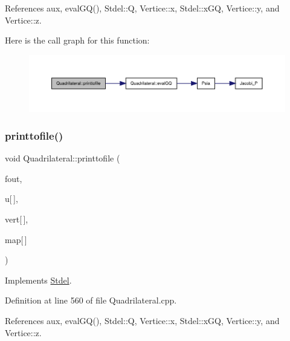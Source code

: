 References aux, eval\+G\+Q(), Stdel\+::Q, Vertice\+::x, Stdel\+::x\+GQ, Vertice\+::y, and Vertice\+::z.

Here is the call graph for this function\+:
\nopagebreak
\begin{figure}[H]
\begin{center}
\leavevmode
\includegraphics[width=350pt]{classQuadrilateral_af2a943c2b5b073fde641ce93b70f95b4_cgraph}
\end{center}
\end{figure}
\mbox{\label{classQuadrilateral_a45573246616ded9a71b895de3969c20d}} 
\subsubsection{\texorpdfstring{printtofile()}{printtofile()}\hspace{0.1cm}{\footnotesize\ttfamily [2/2]}}
{\footnotesize\ttfamily void Quadrilateral\+::printtofile (\begin{DoxyParamCaption}\item[{F\+I\+LE $\ast$}]{fout,  }\item[{const double}]{u\mbox{[}$\,$\mbox{]},  }\item[{const \hyperlink{structVertice}{Vertice}}]{vert\mbox{[}$\,$\mbox{]},  }\item[{const int}]{map\mbox{[}$\,$\mbox{]} }\end{DoxyParamCaption})\hspace{0.3cm}{\ttfamily [virtual]}}



Implements \hyperlink{classStdel_a6863f8aeb8e4fb01299b109b0dd3fe13}{Stdel}.



Definition at line 560 of file Quadrilateral.\+cpp.



References aux, eval\+G\+Q(), Stdel\+::Q, Vertice\+::x, Stdel\+::x\+GQ, Vertice\+::y, and Vertice\+::z.


